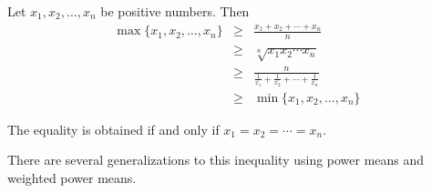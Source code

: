 \documentclass[12pt]{article}
\begin{document}
Let $x_1,x_2,\ldots,x_n$ be positive numbers. 
Then
\begin{eqnarray*}
\max\{x_1,x_2,\ldots,x_n\} &\ge& \frac{x_1+x_2+\cdots+x_n}{n}\\
&\ge& \sqrt[n]{x_1 x_2\cdots x_n} \\
&\ge& \frac{n}{\frac{1}{x_1}+\frac{1}{x_2}+\cdots+\frac{1}{x_n}}\\
&\ge& \min\{x_1,x_2,\ldots,x_n\}
\end{eqnarray*}

The equality is obtained if and only if $x_1=x_2=\cdots = x_n$.

There are several generalizations to this inequality using power means and weighted power means.
\end{document}
